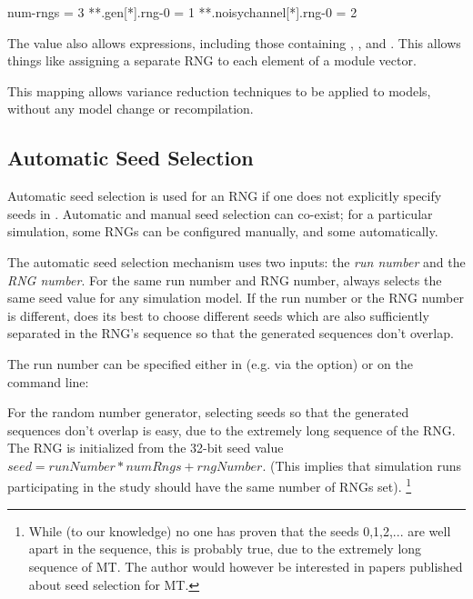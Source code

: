 \begin{inifile}
[General]
num-rngs = 3
**.gen[*].rng-0 = 1
**.noisychannel[*].rng-0 = 2
\end{inifile}

The value also allows expressions, including those containing ,
, and . This allows things
like assigning a separate RNG to each element of a module vector.

This mapping allows variance reduction techniques to be applied to
{\opp} models, without any model change or recompilation.


\subsection{Automatic Seed Selection}
\label{sec:config-sim:automatic-seed-selection}

Automatic seed selection is used for an RNG if one does not explicitly
specify seeds in . Automatic and manual seed selection can
co-exist; for a particular simulation, some RNGs can be configured
manually, and some automatically.

The automatic seed selection mechanism uses two inputs: the \textit{run number}
and the \textit{RNG number}. For the same run number and RNG number,
{\opp} always selects the same seed value for any simulation model.
If the run number or the RNG number is different, {\opp} does its best
to choose different seeds which are also sufficiently separated in the RNG's sequence
so that the generated sequences don't overlap.

The run number can be specified either in  (e.g. via the
 option) or on the command line:


For the  random number generator, selecting seeds
so that the generated sequences don't overlap is easy,
due to the extremely long sequence of the RNG.
The RNG is initialized from the 32-bit seed value $seed = runNumber*numRngs + rngNumber$.
(This implies that simulation runs participating in the study should have
the same number of RNGs set).
    \footnote{While (to our knowledge) no one has proven that the seeds 0,1,2,...
    are well apart in the sequence, this is probably true, due to the extremely
    long sequence of MT. The author would however be interested in papers
    published about seed selection for MT.}

